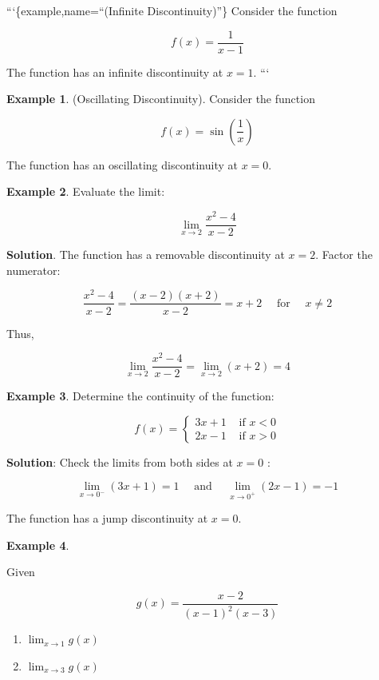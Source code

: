 \documentclass[
]{book}
\providecommand{\tightlist}{%
  \setlength{\itemsep}{0pt}\setlength{\parskip}{0pt}}
\theoremstyle{definition}
\theoremstyle{definition}
\newtheorem{example}{Example}[chapter]
\theoremstyle{definition}
\theoremstyle{definition}
\theoremstyle{remark}
\begin{document}
```\{example,name=``(Infinite Discontinuity)''\} Consider the function

\[
f(x)=\frac{1}{x-1}
\]

The function has an infinite discontinuity at \(x=1\).
```

\begin{example}
\protect\hypertarget{exm:unnamed-chunk-39}{}\label{exm:unnamed-chunk-39}(Oscillating Discontinuity). Consider the function

\[
f(x)=\sin \left(\frac{1}{x}\right)
\]

The function has an oscillating discontinuity at \(x=0\).
\end{example}

\begin{example}
\protect\hypertarget{exm:unnamed-chunk-40}{}\label{exm:unnamed-chunk-40}Evaluate the limit:

\[
\lim _{x \rightarrow 2} \frac{x^{2}-4}{x-2}
\]
\end{example}

\textbf{Solution}. The function has a removable discontinuity at \(x=2\). Factor the numerator:

\[
\frac{x^{2}-4}{x-2}=\frac{(x-2)(x+2)}{x-2}=x+2 \quad \text { for } \quad x \neq 2
\]

Thus,

\[
\lim _{x \rightarrow 2} \frac{x^{2}-4}{x-2}=\lim _{x \rightarrow 2}(x+2)=4
\]

\begin{example}
\protect\hypertarget{exm:unnamed-chunk-41}{}\label{exm:unnamed-chunk-41}Determine the continuity of the function:

\[
f(x)= \begin{cases}3 x+1 & \text { if } x<0 \\ 2 x-1 & \text { if } x>0\end{cases}
\]
\end{example}

\textbf{Solution}: Check the limits from both sides at \(x=0\) :

\[
\lim _{x \rightarrow 0^{-}}(3 x+1)=1 \quad \text { and } \quad \lim _{x \rightarrow 0^{+}}(2 x-1)=-1
\]

The function has a jump discontinuity at \(x=0\).

\begin{example}
\protect\hypertarget{exm:unnamed-chunk-42}{}\label{exm:unnamed-chunk-42}

Given

\[
g(x)=\frac{x-2}{(x-1)^{2}(x-3)}
\]

\begin{enumerate}
\def\labelenumi{(\alph{enumi})}
\tightlist
\item
  \(\lim _{x \rightarrow 1} g(x)\)
\item
  \(\lim _{x \rightarrow 3} g(x)\)
\end{enumerate}

\end{example}
\end{document}
